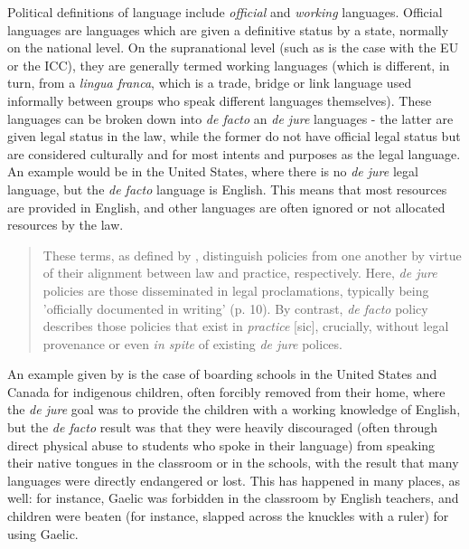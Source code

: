 Political definitions of language include \textit{official} and \textit{working} languages. Official languages are languages which are given a definitive status by a state, normally on the national level. On the supranational level (such as is the case with the EU or the ICC), they are generally termed working languages (which is different, in turn, from a \textit{lingua franca}, which is a trade, bridge or link language used informally between groups who speak different languages themselves). These languages can be broken down into {\it de facto} an {\it de jure} languages - the latter are given legal status in the law, while the former do not have official legal status but are considered culturally and for most intents and purposes as the legal language. An example would be in the United States, where there is no {\it de jure} legal language, but the {\it de facto} language is English. This means that most resources are provided in English, and other languages are often ignored or not allocated resources by the law.

\begin{quote}
These terms, as defined by \citet{johnson2013language}, distinguish policies from one another by virtue of their alignment between law and practice, respectively. Here, {\it de jure} policies are those disseminated in legal proclamations, typically being 'officially documented in writing' (p. 10). By contrast, {\it de facto} policy describes those policies that exist in {\it practice} [sic], crucially, without legal provenance or even {\it in spite} of existing \textit{de jure} polices. \citep{hanks2017policy}
\end{quote}

An example given by \citet{hanks2017policy} is the case of boarding schools in the United States and Canada for indigenous children, often forcibly removed from their home, where the {\it de jure} goal was to provide the children with a working knowledge of English, but the {\it de facto} result was that they were heavily discouraged (often through direct physical abuse to students who spoke in their language) from speaking their native tongues in the classroom or in the schools, with the result that many languages were directly endangered or lost. This has happened in many places, as well: for instance, Gaelic was forbidden in the classroom by English teachers, and children were beaten (for instance, slapped across the knuckles with a ruler) for using Gaelic.

